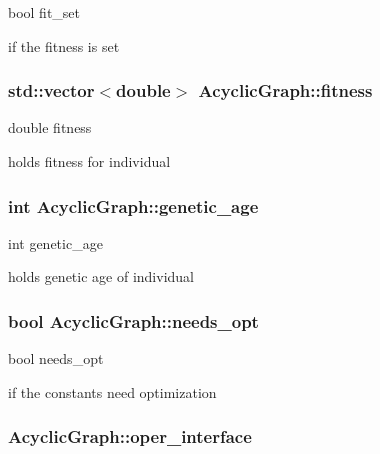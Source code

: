 bool fit\+\_\+set 

if the fitness is set 
\subsubsection[{\texorpdfstring{fitness}{fitness}}]{\setlength{\rightskip}{0pt plus 5cm}std\+::vector$<$double$>$ Acyclic\+Graph\+::fitness}\hypertarget{classAcyclicGraph_a01d92c1b852c41e7a6fdf1085861b5bd}{}\label{classAcyclicGraph_a01d92c1b852c41e7a6fdf1085861b5bd}


double fitness 

holds fitness for individual 
\subsubsection[{\texorpdfstring{genetic\+\_\+age}{genetic_age}}]{\setlength{\rightskip}{0pt plus 5cm}int Acyclic\+Graph\+::genetic\+\_\+age}\hypertarget{classAcyclicGraph_a01d384f2d87fbfe3948ecd58a2b34e31}{}\label{classAcyclicGraph_a01d384f2d87fbfe3948ecd58a2b34e31}


int genetic\+\_\+age 

holds genetic age of individual 
\subsubsection[{\texorpdfstring{needs\+\_\+opt}{needs_opt}}]{\setlength{\rightskip}{0pt plus 5cm}bool Acyclic\+Graph\+::needs\+\_\+opt}\hypertarget{classAcyclicGraph_adad7dd87ced7e2cae5a1ec20a6936ef6}{}\label{classAcyclicGraph_adad7dd87ced7e2cae5a1ec20a6936ef6}


bool needs\+\_\+opt 

if the constants need optimization 
\subsubsection[{\texorpdfstring{oper\+\_\+interface}{oper_interface}}]{ Acyclic\+Graph\+::oper\+\_\+interface}\hypertarget{classAcyclicGraph_a82c104a4c80268bd7705be59c99b73c7}{}\label{classAcyclicGraph_a82c104a4c80268bd7705be59c99b73c7}


